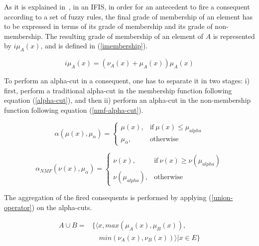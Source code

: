 \documentclass{ieeeaccess}
\begin{document}

As it is explained in~\cite{Hernandez-Aguila2016}, in an IFIS, in order for an
antecedent to fire a consequent according to a set of fuzzy rules, the final
grade of membership of an element has to be expressed in terms of its grade of
membership and its grade of non-membership. The resulting grade of membership of
an element of $A$ is represented by $i\mu_{A}(x)$, and is defined in
(\ref{imembership}).

\begin{equation}
  \label{imembership}
  i\mu_{A}(x) = (\nu_{A}(x) + \mu_{A}(x))\mu_{A}(x)
\end{equation}

To perform an alpha-cut in a consequent, one has to separate it in two stages:
i) first, perform a traditional alpha-cut in the membership function following equation
(\ref{alpha-cut}), and then ii) perform an alpha-cut in the non-membership
function following equation (\ref{nmf-alpha-cut}).

\begin{equation}
  \label{alpha-cut}
  \alpha(\mu (x),\mu_{\alpha}) =
  \begin{cases}
    \mu (x), & \text{if}\ \mu (x) \leq \mu_{alpha}  \\
    \mu_{\alpha}, & \text{otherwise}
  \end{cases}
\end{equation}

\begin{equation}
  \label{nmf-alpha-cut}
  \alpha_{NMF}(\nu (x),\mu_{\alpha}) =
  \begin{cases}
    \nu (x), & \text{if}\ \nu (x) \geq \nu (\mu_{alpha})  \\
    \nu (\mu_{alpha}), & \text{otherwise}
  \end{cases}
\end{equation}

The aggregation of the fired consequents is performed by applying
(\ref{union-operator}) on the alpha-cuts.

\begin{equation}
  \label{union-operator}
  \begin{aligned}
    A \cup B  = &\{ \langle x, max(\mu_{A} (x), \mu_{B} (x)),\\
    &\quad min(\nu_{A} (x), \nu_{B} (x)) \rangle | x \in E \}
\end{aligned}
\end{equation}
\end{document}
